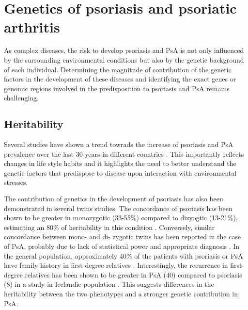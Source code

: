  

\section{Genetics of psoriasis and psoriatic arthritis}

As complex diseases, the risk to develop psoriasis and PsA is not only influenced by the surrounding environmental conditions but also by the genetic background of each individual. Determining the magnitude of contribution of the genetic factors in the development of these diseases and identifying the exact genes or genomic regions involved in the predisposition to psoriasis and PsA remains challenging.  


\subsection{Heritability}

Several studies have shown a trend towrads the increase of psoriasis and PsA prevalence over the last 30 years in different countries \parencite{Organization2016}. This importantly reflects changes in life style habits and it highlights the need to better understand the genetic factors that predispose to disease upon interaction with environmental stresses.

The contribution of genetics in the development of psoriasis has also been demonstrated in several twins studies. The concordance of psoriasis has been shown to be greater in monozygotic (33-55\%) compared to dizyogtic (13-21\%), estimating an 80\% of heritability in this condition \parencite{Faber1974, Duffy1993, Pendersen2008}. Conversely, similar concordance between mono- and di- zygotic twins has been reported in the case of PsA, probably due to lack of statistical power and appropriate diagnosis \parencite{Pendersen2008}. In the general population, approximately 40\% of the patients with psoriasis or PsA have family history in first degree relatives \parencite{Gladman1986}. Interestingly, the recurrence in first-degree relatives has been shown to be greater in PsA (40) compared to psoriasis (8) in a study in Icelandic population \parencite{Chandran2009}. This suggests differences in the heritability between the two phenotypes and a stronger genetic contribution in PsA.

